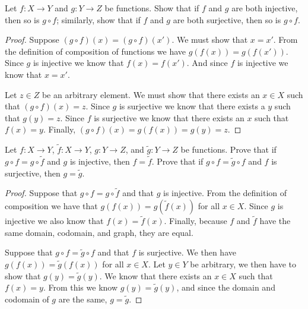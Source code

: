 \documentclass[12pt]{article}
\newenvironment{exercise}[2][Exercise]{\begin{trivlist}
\item[\hskip \labelsep {\bfseries #1}\hskip \labelsep {\bfseries #2}]}{\end{trivlist}}
\begin{document}
\begin{exercise}{3.3.2}
	Let $ f: X \to Y $ and $ g: Y \to Z $ be functions.
	Show that if $ f $ and $ g $ are both injective, then so is $ g \circ f $; similarly, show that if $ f $ and $ g $ are both surjective, then so is $ g \circ f $.
\end{exercise}
\begin{proof}
	Suppose $ (g \circ f)(x) = (g \circ f)(x') $.
	We must show that $ x = x' $.
	From the definition of composition of functions we have $ g(f(x)) = g(f(x')) $.
	Since $ g $ is injective we know that $ f(x) = f(x') $.
	And since $ f $ is injective we know that $ x = x' $.
	
	Let $ z \in Z $ be an arbitrary element.
	We must show that there exists an $ x \in X $ such that $ (g \circ f)(x) = z $.
	Since $ g $ is surjective we know that there exists a $ y $ such that $ g(y) = z $.
	Since $ f $ is surjective we know that there exists an $ x $ such that $ f(x) = y $.
	Finally, $ (g \circ f)(x) = g(f(x)) = g(y) = z $.
\end{proof}

\begin{exercise}{3.3.4}
	Let $ f: X \to Y$, $ \tilde{f}: X \to Y$, $g: Y \to Z$, and $ \tilde{g}: Y \to Z $ be functions.
	Prove that if $ g \circ f = g \circ \tilde{f} $ and $ g $ is injective, then $ f = \tilde{f} $.
	Prove that if $ g \circ f = \tilde{g} \circ f $ and $ f $ is surjective, then $ g = \tilde{g} $.
\end{exercise}
\begin{proof}
	Suppose that $ g \circ f = g \circ \tilde{f} $ and that $ g $ is injective.
	From the definition of composition we have that $ g(f(x)) = g(\tilde{f}(x)) $ for all $ x \in X $.
	Since $ g $ is injective we also know that $ f(x) = \tilde{f}(x) $.
	Finally, because $ f $ and $ \tilde{f} $ have the same domain, codomain, and graph, they are equal.
	
	Suppose that $ g \circ f = \tilde{g} \circ f $ and that $ f $ is surjective.
	We then have $ g(f(x)) = \tilde{g}(f(x)) $ for all $ x \in X $.
	Let $ y \in Y $ be arbitrary, we then have to show that $ g(y) = \tilde{g}(y) $.
	We know that there exists an $ x \in X $ such that $ f(x) = y $.
	From this we know $ g(y) = \tilde{g}(y) $, and since the domain and codomain of $ g $ are the same, $ g = \tilde{g} $.
\end{proof}
\end{document}
